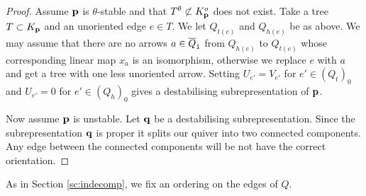 \documentclass{amsart}
\theoremstyle{definition}
\begin{document}
\begin{proof}
Assume $\mathbf{p}$ is $\theta$-stable and that $T^\theta \not\subset K_{\mathbf{p}}^o$ does not exist.
Take a tree $T \subset K_{\mathbf{p}}$ and an unoriented edge $e \in T$.
We let $Q_{t(e)}$ and $Q_{h(e)}$ be as above.
We may assume that there are no arrows $a \in {\overline{Q}}_1$ from $Q_{h(e)}$ to $Q_{t(e)}$ whose corresponding linear map $x_{a}$ is an isomorphism, otherwise we replace $e$ with $a$ and get a tree with one less unoriented arrow.
Setting $U_{e'} = V_{e'}$ for $e' \in (Q_t)_0$ and $U_{e'}=0$ for $e' \in (Q_h)_0$ gives a destabilising subrepresentation of $\mathbf{p}$.

Now assume $\mathbf{p}$ is unstable.
Let $\mathbf{q}$ be a destabilising subrepresentation.
Since the subrepresentation $\mathbf{q}$ is proper it splits our quiver into two connected components.
Any edge between the connected components will be not have the correct orientation.
\end{proof}

As in Section \ref{sc:indecomp}, we fix an ordering on the edges of $Q$.
\end{document}
